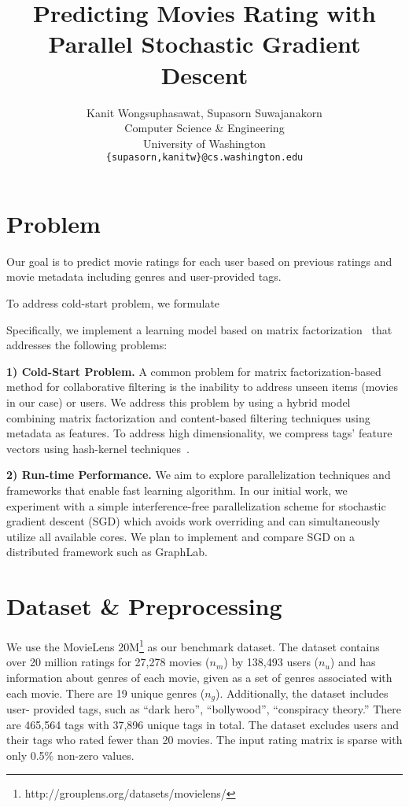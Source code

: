 \documentclass{article} %
\title{Predicting Movies Rating with Parallel Stochastic Gradient Descent}
\author{
	Kanit Wongsuphasawat, Supasorn Suwajanakorn \\
	Computer Science \& Engineering\\
	University of Washington\\
	\texttt{\{supasorn,kanitw\}@cs.washington.edu} \\
}
\begin{document}
\maketitle

\section{Problem}

	Our goal is to predict movie ratings for each user based on previous ratings
	and movie metadata including genres and user-provided tags.

	To address cold-start problem, we formulate


	Specifically, we implement a learning model based on matrix
	factorization~\cite{koren:matrix} that addresses the following problems:

	\textbf{1) Cold-Start Problem.}
	A common problem for matrix factorization-based method for collaborative
	filtering is the inability to address unseen items (movies in our case) or
	users.  We address this problem by using a hybrid model combining matrix
	factorization and content-based filtering techniques using metadata as
	features. To address high dimensionality, we compress tags' feature vectors
	using hash-kernel techniques~\cite{shi:hashkernels}.

	\textbf{2) Run-time Performance.}
	We aim to explore parallelization techniques and frameworks that enable fast
	learning algorithm.  In our initial work, we experiment with a simple
	interference-free parallelization scheme for stochastic gradient descent
	(SGD) which avoids work overriding and can simultaneously utilize all
	available cores. We plan to implement and compare SGD on a distributed
	framework such as GraphLab.


\section{Dataset \& Preprocessing}

	We use the MovieLens 20M\footnote{http://grouplens.org/datasets/movielens/}
	as our benchmark dataset.  The dataset contains over 20 million ratings for
	27,278 movies ($n_m$) by 138,493 users ($n_u$) and has information about
	genres of each movie, given as a set of genres associated with each
	movie. There are 19 unique genres ($n_g$). Additionally, the dataset includes user-
	provided tags, such as ``dark hero'', ``bollywood'', ``conspiracy theory.''
	There are 465,564 tags with 37,896 unique tags in total. The dataset
	excludes users and their tags who rated fewer than 20 movies. The input
	rating matrix is sparse with only 0.5\% non-zero values.
\end{document}
